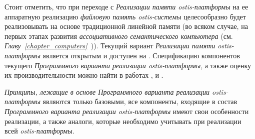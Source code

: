 Стоит отметить, что при переходе с \textit{Реализации памяти ostis-платформы} на ее аппаратную реализацию \textit{файловую память ostis-системы} целесообразно будет реализовывать на основе традиционной линейной памяти (во всяком случае, на первых этапах развития \textit{ассоциативного семантического компьютера} (см. \textit{Главу~\ref{chapter_computers}~})). Текущий вариант \textit{Реализации памяти ostis-платформы} является открытым и доступен на . Спецификацию компонентов текущего \textit{Программного варианта реализации ostis-платформы}, а также оценку их производительности можно найти в работах ,  и .

\textit{Принципы, лежащие в основе Программного варианта реализации ostis-платформы} являются только базовыми, все компоненты, входящие в состав \textit{Программного варианта реализации ostis-платформы} имеют свои особенности реализации, а также аналоги, которые необходимо учитывать при реализации всей \textit{ostis-платформы}.

